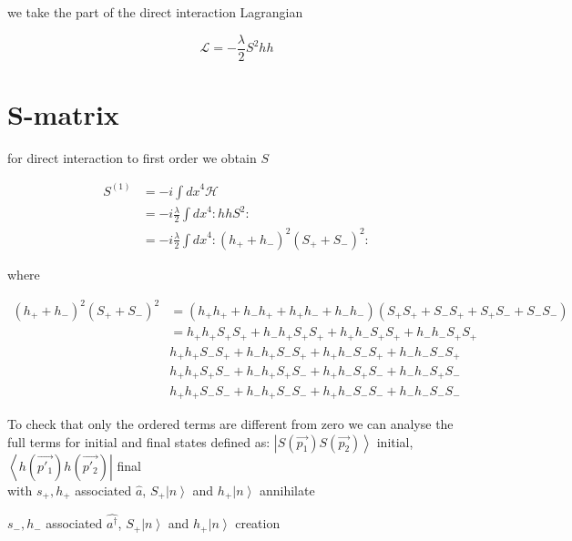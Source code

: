 we take the part of the direct interaction Lagrangian

\begin{equation}
  \mathcal{L}=-\frac{\lambda}{2}S^2 hh
\end{equation}

\section{S-matrix}

for direct interaction to first order we obtain $S$

\begin{equation}
  \begin{split}
    S^{(1)} & {=- i \int {dx}^4 \mathcal{H}}\\
    & =  {- i \frac{\lambda}{2}\int {dx}^4 :hhS^2:}\\
    &  =  {- i \frac{\lambda}{2}\int {dx}^4 :{(h_++h_-)}^2{(S_++S_-)}^2 :}
  \end{split}
\end{equation}

where

\begin{equation}
  \begin{split}
    {(h_++h_-)}^2{(S_++S_-)}^2 & = (h_+h_++h_-h_++h_+h_-+h_-h_-)(S_+S_++S_-S_++S_+S_-+S_-S_-)\\
    & = {h_+h_+S_+S_++h_-h_+S_+S_++h_+h_-S_+S_++h_-h_-S_+S_+}\\
    &{h_+h_+S_-S_++h_-h_+S_-S_++h_+h_-S_-S_++h_-h_-S_-S_+}\\
    &{h_+h_+S_+S_-+h_-h_+S_+S_-+h_+h_-S_+S_-+h_-h_-S_+S_-}\\
    &{h_+h_+S_-S_-+h_-h_+S_-S_-+h_+h_-S_-S_-+h_-h_-S_-S_-}
  \end{split}
\end{equation}

To check that only the ordered terms are different from zero we can analyse the full terms for initial and final states defined as:
$\left| S(\vec{p_1})S(\vec{p_2}) \right\rangle $ initial, 
$\left\langle  h(\vec{p'_1}) h(\vec{p'_2})\right|$ final\\

with $s_+, h_+$ associated $ \hat {a}$, $S_+ \left |n\right \rangle$ and $h_+ \left|n\right\rangle$ annihilate

$s_-, h_-$ associated $ \hat {a^{\dagger}}$, $S_+ \left |n\right \rangle$ and $h_+ \left|n\right\rangle$ creation\\

